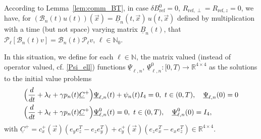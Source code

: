 \documentclass[12pt]{article}
\newcommand\BB{\mathcal{B}}
\newcommand\Proj{\mathcal{P}}
\newcommand\vecr{\vec{x}}
\newcommand\ulB{\underline{B}}
\newcommand\ulC{\underline{C}}
\newcommand\ulPsi{\underline{\Psi}}
\begin{document}
According to Lemma~\ref{lem:comm_BT}, in case $\delta B^0_{\text{ref}}=0$, $R_{\text{ref},\perp}=R_{\text{ref},z}=0$, we have, for  
$(\BB_n(t)u(t))(\vecr)=\ulB_n(t,\vecr)\, u(t,\vecr)$
defined by multiplication with a time (but not space) varying matrix $\ulB_n(t)$, that $\Proj_\ell[\BB_n(t)v]=\BB_n(t)\Proj_\ell v$, $\ell\in\mathbb{N}_0$. 

In this situation, 
we define 
for each $\ell\in\mathbb{N}$, the matrix valued (instead of operator valued, cf. \eqref{Psi_ell}) functions $\ulPsi_{\ell,n},\,\ulPsi_{\ell,n}^0:[0,T)\to \mathbb{R}^{4\times 4}$
 as the solutions to the initial value problems  
\begin{equation}\label{Psi_ell_BT}
\begin{aligned}
&\Bigl(\frac{d}{dt}+\lambda_\ell+\gamma p_n(t)\ulC^+\Bigr)\ulPsi_{\ell,n}(t)+\psi_n(t)I_4=0, \ t\in(0,T),\quad \ulPsi_{\ell,n}(0)=0\\  
&\Bigl(\frac{d}{dt}+\lambda_\ell+\gamma p_n(t)\ulC^+\Bigr)\ulPsi_{\ell,n}^0(t)=0, \ t\in(0,T),\quad \ulPsi_{\ell,n}^0(0)=I_4,
\end{aligned}
\end{equation}
with $\ulC^+=c_x^+(\vecr)(e_ye_z^T-e_ze_y^T)+c_y^+(\vecr)(e_ze_x^T-e_xe_z^T)\in\mathbb{R}^{4\times 4}$.
\end{document}
